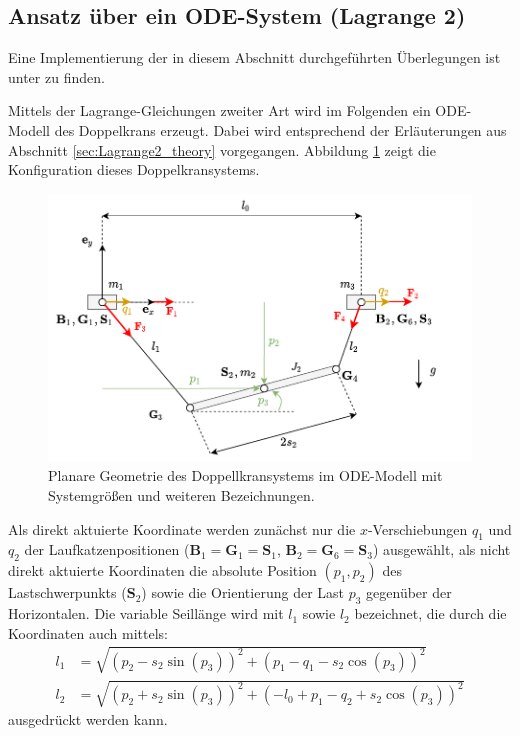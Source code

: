 \subsection{Ansatz über ein ODE-System (Lagrange 2)}
Eine Implementierung der in diesem Abschnitt durchgeführten Überlegungen ist unter \cite[flatness\_notebooks/ODE\_flatness\_analysis.ipynb]{SAGithub} zu finden.

Mittels der Lagrange-Gleichungen zweiter Art wird im Folgenden ein ODE-Modell des Doppelkrans erzeugt. Dabei wird entsprechend der Erläuterungen aus Abschnitt \ref{sec:Lagrange2_theory} vorgegangen. Abbildung \ref{fig:double_crane_diagram} zeigt die Konfiguration dieses Doppelkransystems.

\begin{figure}[ht]
	\begin{center}
		\includegraphics[scale=1]{Pictures/ODE_flatness_analysis_double_crane_diagram}
	\end{center}
	\caption[Planare Geometrie des Doppellkransystems im ODE-Modell]
	{Planare Geometrie des Doppellkransystems im ODE-Modell mit Systemgrößen und weiteren Bezeichnungen.}
	\label{fig:double_crane_diagram}
\end{figure}


Als direkt aktuierte Koordinate werden zunächst nur die $x$-Verschiebungen $q_1$ und $q_2$ der Laufkatzenpositionen ($\mathbf{B}_1 = \mathbf{G}_1 = \mathbf{S}_1$, $\mathbf{B}_2 = \mathbf{G}_6 = \mathbf{S}_3$) ausgewählt, als nicht direkt aktuierte Koordinaten die absolute Position $(p_1, p_2)$ des Lastschwerpunkts ($\mathbf{S}_2$) sowie die Orientierung der Last $p_3$ gegenüber der Horizontalen. Die variable Seillänge wird mit $l_1$ sowie $l_2$ bezeichnet, die durch die Koordinaten auch mittels:
\begin{align}
l_1 &= \sqrt{\left(p_{2} - s_{2} \sin{\left(p_{3} \right)}\right)^{2} + \left(p_{1} - q_{1} - s_{2} \cos{\left(p_{3} \right)}\right)^{2}} \\
l_2 &= \sqrt{\left(p_{2} + s_{2} \sin{\left(p_{3} \right)}\right)^{2} + \left(- l_{0} + p_{1} - q_{2} + s_{2} \cos{\left(p_{3} \right)}\right)^{2}}
\end{align}
ausgedrückt werden kann.

